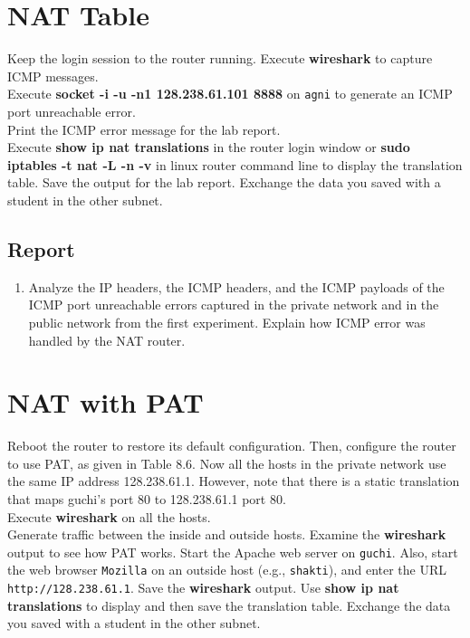 \documentclass[10pt,a4paper]{article}
\numberwithin{equation}{section}
\numberwithin{figure}{section}
\numberwithin{table}{section}
\begin{document}
    \section*{NAT Table}
    Keep the login session to the router running. Execute \textbf{wireshark} to capture ICMP messages. \\
    Execute \textbf{socket -i -u -n1 128.238.61.101 8888} on \texttt{agni} to generate an ICMP port unreachable error. \\
    Print the ICMP error message for the lab report. \\
    Execute \textbf{show ip nat translations} in the router login window or \textbf{sudo iptables -t nat -L -n -v} in linux router command line to display the translation table.
    Save the output for the lab report.
    Exchange the data you saved with a student in the other subnet.
    \subsection*{Report}
    \begin{enumerate}
        \item Analyze the IP headers, the ICMP headers, and the ICMP payloads of the ICMP port unreachable errors captured in the private network and in the public network from the first experiment.
        Explain how ICMP error was handled by the NAT router.
    \end{enumerate}

    \section*{NAT with PAT}
    Reboot the router to restore its default configuration.
    Then, configure the router to use PAT, as given in Table 8.6. Now all the hosts in the private network use the same IP address 128.238.61.1. However, note that there is a static translation that maps guchi’s port 80 to 128.238.61.1 port 80. \\
    Execute \textbf{wireshark} on all the hosts. \\
    Generate traffic between the inside and outside hosts.
    Examine the \textbf{wireshark} output to see how PAT works.
    Start the Apache web server on \texttt{guchi}. Also, start the web browser \texttt{Mozilla} on an outside host (e.g., \texttt{shakti}), and enter the URL \texttt{http://128.238.61.1}. Save the \textbf{wireshark} output.
    Use \textbf{show ip nat translations} to display and then save the translation table.
    Exchange the data you saved with a student in the other subnet.
\end{document}
